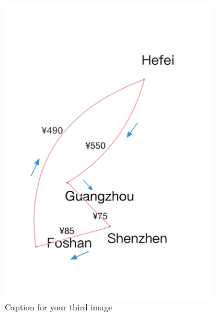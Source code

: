 \documentclass{extarticle}
\begin{document}
\begin{figure}[!ht]
\begin{subfigure}{0.3\textwidth}
      \includegraphics[width=\textwidth]{pic/2.png}
      \caption{Caption for your third image}%
\label{fig:your_image2}
  \end{subfigure}%
  \hfill %
  \begin{subfigure}{0.3\textwidth}

\end{subfigure}
\end{figure}
\end{document}
